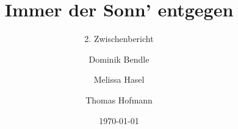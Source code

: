 \documentclass[aspectratio=43]{beamer}
\title{Immer der Sonn' entgegen}
\subtitle{2. Zwischenbericht}
\author{Dominik Bendle \and Melissa Hasel \and Thomas Hofmann}
\date{\today}
\institute{TU Kaiserslautern}
\begin{document}
\begin{frame}[plain]


\end{frame}
\end{document}
